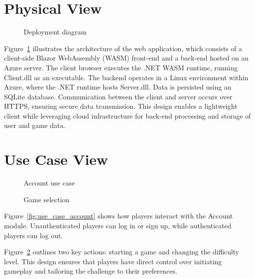\documentclass[11pt,a4paper]{article}
\newcommand{\inputdiagram}[1]{}
\newcommand{\textwidthdiagram}[2][1]{%
  \resizebox{#1\textwidth}{!}{\inputdiagram{#2}}%
}
\begin{document}
\section{Physical View}
\begin{figure}[H]
    \centering
    \textwidthdiagram[0.8]{deployment_diagram.tex}
    \caption{Deployment diagram}
    \label{fig:deployment_diagram}
\end{figure}

Figure~\ref{fig:deployment_diagram} illustrates the architecture of the web application,
which consists of a client-side Blazor WebAssembly (WASM) front-end and a back-end hosted on an Azure server. The client browser executes the .NET WASM
runtime, running Client.dll as an executable. The backend operates in a Linux
environment within Azure, where the .NET runtime hosts Server.dll. Data is
persisted using an SQLite database. Communication between the client and
server occurs over HTTPS, ensuring secure data transmission. This design
enables a lightweight client while leveraging cloud infrastructure for
back-end processing and storage of user and game data.

\section{Use Case View}

\begin{figure}[H]
    \begin{minipage}[b]{0.48\textwidth}
        \centering
        \textwidthdiagram{use_case_account.tex}
        \caption{Account use case}
        \label{fig:use_case_account}
    \end{minipage}
    \hfil
    \begin{minipage}[b]{0.48\textwidth}
        \centering
        \textwidthdiagram{use_case_game_selection.tex}
        \caption{Game selection}
        \label{fig:use_case_game_selection}
    \end{minipage}
\end{figure}

Figure~\ref{fig:use_case_account} shows how players interact with the Account module.
Unauthenticated players can log in or sign up, while authenticated players can log out.

Figure~\ref{fig:use_case_game_selection} outlines two key actions: starting a game and
changing the difficulty level. This design ensures that players have direct
control over initiating gameplay and tailoring the challenge to their
preferences.
\end{document}
